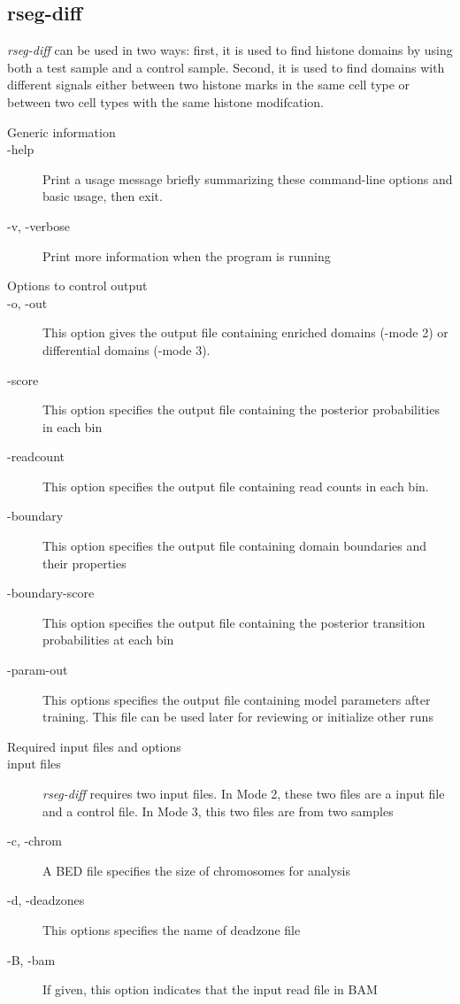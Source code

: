 \documentclass[11pt]{report}
\begin{document}
\subsection{rseg-diff}
\label{sec:rseg-diff-detail}

\textit{rseg-diff} can be used in two ways: first, it is used to find
histone domains by using both a test sample and a control
sample. Second, it is used to find domains with different signals
either between two histone marks in the same cell type or between two
cell types with the same histone modifcation. 

\begin{description}
\item[Generic information]
\item[-help] Print a usage message briefly summarizing these
  command-line options and basic usage, then exit.
\item[-v, -verbose] Print more information when the program is running
\item[Options to control output]
\item[-o, -out] This option gives the output file containing enriched domains
  (-mode 2) or differential domains (-mode 3).
\item[-score] This option specifies the output file containing the posterior
  probabilities in each bin
\item[-readcount] This option specifies the output file containing read counts
  in each bin.
\item[-boundary] This option specifies the output file containing domain
  boundaries and their properties
\item[-boundary-score] This option specifies the output file containing the
  posterior transition probabilities at each bin
\item[-param-out] This options specifies the output file containing model
  parameters after training. This file can be used later for reviewing or
  initialize other runs
\item[Required input files and options]
\item[input files] \textit{rseg-diff} requires two input files. In
  Mode 2, these two files are a input file and a control file. In Mode
  3, this two files are from two samples
\item[-c, -chrom] A BED file specifies the size of chromosomes for
  analysis
\item[-d, -deadzones] This options specifies the name of deadzone
  file
\item[-B, -bam] If given, this option indicates that the input read file in BAM

\end{description}
\end{document}
